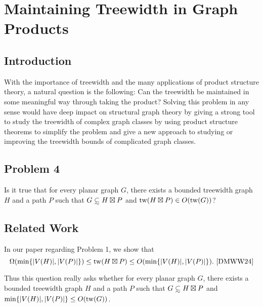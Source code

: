 \documentclass[../main.tex]{subfiles}
\begin{document}
	
	\section{Maintaining Treewidth in Graph Products}
	\subsection{Introduction}
	With the importance of treewidth and the many applications of product structure theory, a natural question is the following: Can the treewidth be maintained in some meaningful way through taking the product? Solving this problem in any sense would have deep impact on structural graph theory by giving a strong tool to study the treewidth of complex graph classes by using product structure theorems to simplify the problem and give a new approach to studying or improving the treewidth bounds of complicated graph classes.
	\subsection{Problem 4}
	  Is it true that for every planar graph $G$, there exists a bounded treewidth graph $H$ and a path $P$ such that $G \subsetsim H\boxtimes P$ and $\operatorname{tw}(H\boxtimes P) \in O(\operatorname{tw}(G))$? 
	
	\subsection{Related Work}
	In our paper regarding Problem 1\cite{DMWW24}, we show that $$\Omega(\min\{|V(H)|,|V(P)|\})\leq  \tw( H\boxtimes P) \leq O(\min\{|V(H)|,|V(P)|\}).~\text{\cite[Lemma~3, Equation~(2)]{DMWW24}}$$ 
	
	Thus this question really asks whether for every planar graph $G$, there exists a bounded treewidth graph $H$ and a path $P$ such that $G\subsetsim H\boxtimes P$ and $\min\{|V(H)|,|V(P)|\} \leq O(\operatorname{tw}(G))$. 
	
	
	
\end{document}
